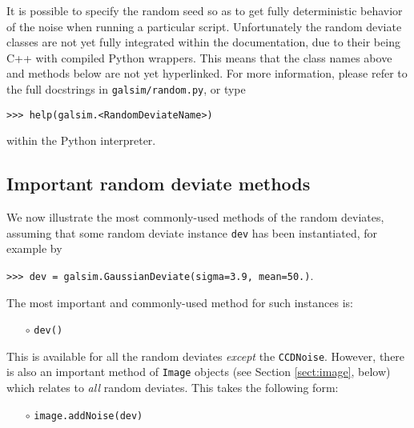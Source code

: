 \documentclass[preprint,11pt]{../../devel/modules/aastex}
\begin{document}
It is possible to specify the random seed so as to get fully
deterministic behavior of the noise when running a particular script.
Unfortunately the random deviate classes are not yet fully integrated
within the documentation, due to their being C++ with compiled Python
wrappers.  This means that the class names above and methods below are
not yet hyperlinked.  For more information, please refer to the full docstrings in
\texttt{galsim/random.py}, 
or type

{\tt >>> help(galsim.<RandomDeviateName>)}

within the Python interpreter.

\subsection{Important random deviate methods}\label{sect:randommethods}
We now illustrate the most commonly-used methods of the random
deviates, assuming that some random deviate instance \texttt{dev} has
been instantiated, for example by

{\tt >>> dev = galsim.GaussianDeviate(sigma=3.9, mean=50.)}.

The most important and commonly-used method for such
instances is:
\begin{itemize}

\item[$\circ$] \texttt{dev()} 

\end{itemize}
This is available for all the random deviates \emph{except} the \texttt{CCDNoise}.
However, there is also an important method of \texttt{Image} objects
(see Section \ref{sect:image}, below) which relates to \emph{all} random
deviates.  This takes the following form:

\begin{itemize}

\item[$\circ$] \texttt{image.addNoise(dev)} 

\end{itemize}
\end{document}
